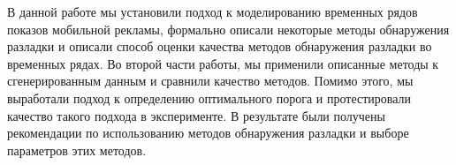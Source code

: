 \documentclass[%
12pt,
master,  %
natbib,      %
subf,        %
substylefile = spbu.rtx,
href,        %
colorlinks,  %
]{disser}
\begin{document}
%
%



\conclusion
В данной работе мы установили подход к моделированию временных рядов показов мобильной рекламы, формально описали некоторые методы обнаружения разладки и описали способ оценки качества методов обнаружения разладки во временных рядах. Во второй части работы, мы применили описанные методы к сгенерированным данным и сравнили качество методов. Помимо этого, мы выработали подход к определению оптимального порога и протестировали качество такого подхода в эксперименте. В результате были получены рекомендации по использованию методов обнаружения разладки и выборе параметров этих методов.


%

%
\end{document}
